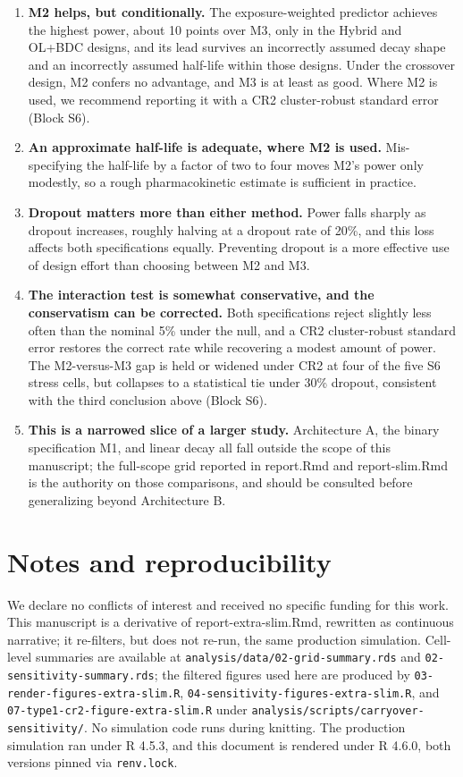 \documentclass[
  11pt,
]{article}
\begin{document}
\begin{enumerate}
\def\labelenumi{\arabic{enumi}.}
\item
  \textbf{M2 helps, but conditionally.} The exposure-weighted predictor
  achieves the highest power, about 10 points over M3, only in the
  Hybrid and OL+BDC designs, and its lead survives an incorrectly
  assumed decay shape and an incorrectly assumed half-life within
  those designs. Under the crossover design, M2 confers no
  advantage, and M3 is at least as good. Where M2 is used, we
  recommend reporting it with a CR2 cluster-robust standard error
  (Block S6).
\item
  \textbf{An approximate half-life is adequate, where M2 is used.}
  Mis-specifying the half-life by a factor of two to four moves
  M2's power only modestly, so a rough pharmacokinetic estimate is
  sufficient in practice.
\item
  \textbf{Dropout matters more than either method.} Power falls sharply
  as dropout increases, roughly halving at a dropout rate of 20\%,
  and this loss affects both specifications equally. Preventing
  dropout is a more effective use of design effort than choosing
  between M2 and M3.
\item
  \textbf{The interaction test is somewhat conservative, and the
  conservatism can be corrected.} Both specifications reject
  slightly less often than the nominal 5\% under the null, and a CR2
  cluster-robust standard error restores the correct rate while
  recovering a modest amount
  of power. The M2-versus-M3 gap is held or widened under CR2 at
  four of the five S6 stress cells, but collapses to a statistical
  tie under 30\% dropout, consistent with the third conclusion above
  (Block S6).
\item
  \textbf{This is a narrowed slice of a larger study.} Architecture A,
  the binary specification M1, and linear decay all fall outside
  the scope of this manuscript; the full-scope grid reported in
  report.Rmd and report-slim.Rmd is the authority on those
  comparisons, and should be consulted before generalizing beyond
  Architecture B.
\end{enumerate}

\section*{Notes and reproducibility}\label{notes-and-reproducibility}

We declare no conflicts of interest and received no specific funding
for this work. This manuscript is a derivative of
report-extra-slim.Rmd, rewritten as continuous narrative; it
re-filters, but does not re-run, the same production simulation.
Cell-level summaries are available at
\texttt{analysis/data/02-grid-summary.rds} and
\texttt{02-sensitivity-summary.rds}; the filtered figures used here are
produced by \texttt{03-render-figures-extra-slim.R},
\texttt{04-sensitivity-figures-extra-slim.R}, and
\texttt{07-type1-cr2-figure-extra-slim.R} under
\texttt{analysis/scripts/carryover-sensitivity/}. No simulation code runs
during knitting. The production simulation ran under R 4.5.3, and
this document is rendered under R 4.6.0, both versions pinned via
\texttt{renv.lock}.
\end{document}
